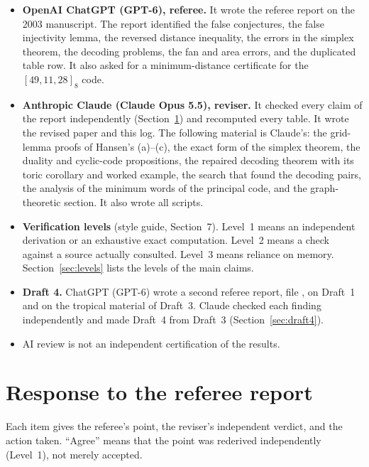 \documentclass[12pt,letterpaper]{article}
\begin{document}
\begin{itemize}[leftmargin=*]
\item \textbf{OpenAI ChatGPT (GPT-6), referee.} It wrote the referee report on
the 2003 manuscript. The report identified the false conjectures, the false
injectivity lemma, the reversed distance inequality, the errors in the
simplex theorem, the decoding problems, the fan and area errors, and the
duplicated table row. It also asked for a minimum-distance certificate for
the $[49,11,28]_8$ code.
\item \textbf{Anthropic Claude (Claude Opus 5.5), reviser.} It checked every
claim of the report independently (Section~\ref{sec:referee}) and recomputed
every table. It wrote the revised paper and this log. The following material
is Claude's: the grid-lemma proofs of Hansen's (a)--(c), the exact form of
the simplex theorem, the duality and cyclic-code propositions, the repaired
decoding theorem with its toric corollary and worked example, the search
that found the decoding pairs, the analysis of the minimum words of the
principal code, and the graph-theoretic section. It also wrote all scripts.
\item \textbf{Verification levels} (style guide, Section~7). Level~1 means an
independent derivation or an exhaustive exact computation. Level~2 means a
check against a source actually consulted. Level~3 means reliance on memory.
Section~\ref{sec:levels} lists the levels of the main claims.
\item \textbf{Draft 4.} ChatGPT (GPT-6) wrote a second referee report, file
, on Draft~1 and
on the tropical material of Draft~3. Claude checked each finding
independently and made Draft~4 from Draft~3 (Section~\ref{sec:draft4}).
\item AI review is not an independent certification of the results.
\end{itemize}

\section{Response to the referee report}\label{sec:referee}

Each item gives the referee's point, the reviser's independent verdict, and
the action taken. ``Agree'' means that the point was rederived independently
(Level~1), not merely accepted.
\end{document}
